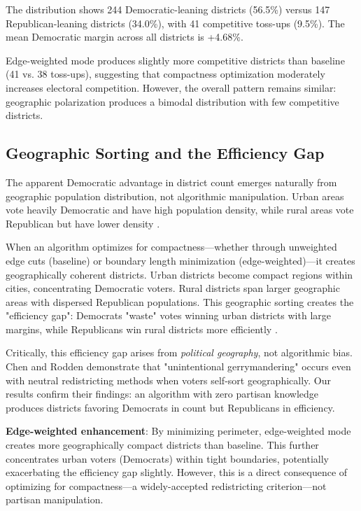 The distribution shows 244 Democratic-leaning districts (56.5\%) versus 147 Republican-leaning districts (34.0\%), with 41 competitive toss-ups (9.5\%). The mean Democratic margin across all districts is +4.68\%.

Edge-weighted mode produces slightly more competitive districts than baseline (41 vs. 38 toss-ups), suggesting that compactness optimization moderately increases electoral competition. However, the overall pattern remains similar: geographic polarization produces a bimodal distribution with few competitive districts.

\subsection{Geographic Sorting and the Efficiency Gap}

The apparent Democratic advantage in district count emerges naturally from geographic population distribution, not algorithmic manipulation. Urban areas vote heavily Democratic and have high population density, while rural areas vote Republican but have lower density \cite{rodden2019why}.

When an algorithm optimizes for compactness—whether through unweighted edge cuts (baseline) or boundary length minimization (edge-weighted)—it creates geographically coherent districts. Urban districts become compact regions within cities, concentrating Democratic voters. Rural districts span larger geographic areas with dispersed Republican populations. This geographic sorting creates the "efficiency gap": Democrats "waste" votes winning urban districts with large margins, while Republicans win rural districts more efficiently \cite{stephanopoulos2015partisan}.

Critically, this efficiency gap arises from \textit{political geography}, not algorithmic bias. Chen and Rodden \cite{chen2013unintentional} demonstrate that "unintentional gerrymandering" occurs even with neutral redistricting methods when voters self-sort geographically. Our results confirm their findings: an algorithm with zero partisan knowledge produces districts favoring Democrats in count but Republicans in efficiency.

\textbf{Edge-weighted enhancement}: By minimizing perimeter, edge-weighted mode creates more geographically compact districts than baseline. This further concentrates urban voters (Democrats) within tight boundaries, potentially exacerbating the efficiency gap slightly. However, this is a direct consequence of optimizing for compactness—a widely-accepted redistricting criterion—not partisan manipulation.

